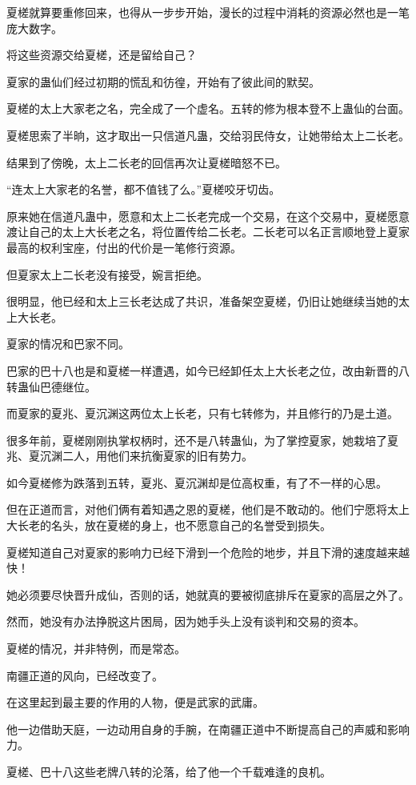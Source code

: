 \begin{this_body}
夏槎就算要重修回来，也得从一步步开始，漫长的过程中消耗的资源必然也是一笔庞大数字。

将这些资源交给夏槎，还是留给自己？

夏家的蛊仙们经过初期的慌乱和彷徨，开始有了彼此间的默契。

夏槎的太上大家老之名，完全成了一个虚名。五转的修为根本登不上蛊仙的台面。

夏槎思索了半晌，这才取出一只信道凡蛊，交给羽民侍女，让她带给太上二长老。

结果到了傍晚，太上二长老的回信再次让夏槎暗怒不已。

“连太上大家老的名誉，都不值钱了么。”夏槎咬牙切齿。

原来她在信道凡蛊中，愿意和太上二长老完成一个交易，在这个交易中，夏槎愿意渡让自己的太上大长老之名，将位置传给二长老。二长老可以名正言顺地登上夏家最高的权利宝座，付出的代价是一笔修行资源。

但夏家太上二长老没有接受，婉言拒绝。

很明显，他已经和太上三长老达成了共识，准备架空夏槎，仍旧让她继续当她的太上大长老。

夏家的情况和巴家不同。

巴家的巴十八也是和夏槎一样遭遇，如今已经卸任太上大长老之位，改由新晋的八转蛊仙巴德继位。

而夏家的夏兆、夏沉渊这两位太上长老，只有七转修为，并且修行的乃是土道。

很多年前，夏槎刚刚执掌权柄时，还不是八转蛊仙，为了掌控夏家，她栽培了夏兆、夏沉渊二人，用他们来抗衡夏家的旧有势力。

如今夏槎修为跌落到五转，夏兆、夏沉渊却是位高权重，有了不一样的心思。

但在正道而言，对他们俩有着知遇之恩的夏槎，他们是不敢动的。他们宁愿将太上大长老的名头，放在夏槎的身上，也不愿意自己的名誉受到损失。

夏槎知道自己对夏家的影响力已经下滑到一个危险的地步，并且下滑的速度越来越快！

她必须要尽快晋升成仙，否则的话，她就真的要被彻底排斥在夏家的高层之外了。

然而，她没有办法挣脱这片困局，因为她手头上没有谈判和交易的资本。

夏槎的情况，并非特例，而是常态。

南疆正道的风向，已经改变了。

在这里起到最主要的作用的人物，便是武家的武庸。

他一边借助天庭，一边动用自身的手腕，在南疆正道中不断提高自己的声威和影响力。

夏槎、巴十八这些老牌八转的沦落，给了他一个千载难逢的良机。


\end{this_body}
